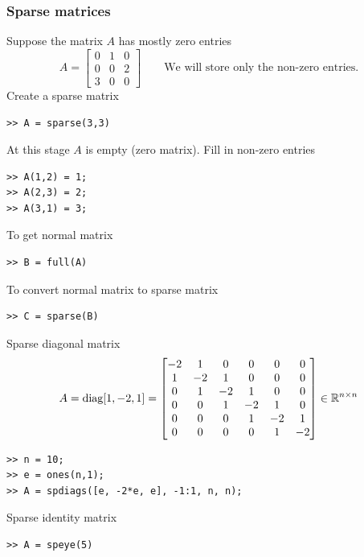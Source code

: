 \documentclass[11pt,xcolor=svgnames,onlymath]{beamer}
\begin{document}
\begin{frame}
\frametitle{Sparse matrices}
Suppose the matrix $A$ has mostly zero entries
\[
A = \begin{bmatrix}
0 & 1 & 0 \\
0 & 0 & 2 \\
3 & 0 & 0
\end{bmatrix} \qquad \mbox{We will store only the non-zero entries.}
\]
Create a sparse matrix
\begin{lstlisting}
>> A = sparse(3,3)
\end{lstlisting}

At this stage $A$ is empty (zero matrix). Fill in non-zero entries
\begin{lstlisting}
>> A(1,2) = 1;
>> A(2,3) = 2;
>> A(3,1) = 3;
\end{lstlisting}

To get normal matrix
\begin{lstlisting}
>> B = full(A)
\end{lstlisting}

To convert normal matrix to sparse matrix
\begin{lstlisting}
>> C = sparse(B)
\end{lstlisting}

Sparse diagonal matrix
\[
A = \mbox{diag}[1, -2, 1] = \begin{bmatrix}
-2 & 1 & 0 & 0 & 0 & 0 \\
1  & -2 & 1 & 0 & 0 & 0 \\
0  & 1 & -2 & 1 & 0 & 0 \\
0  & 0 & 1 & -2 & 1 & 0 \\
0  & 0 & 0 & 1 & -2 & 1 \\
0  & 0 & 0 & 0 & 1 & -2

\end{bmatrix} \in \mathbb{R}^{n \times n}
\]
\begin{lstlisting}
>> n = 10;
>> e = ones(n,1);
>> A = spdiags([e, -2*e, e], -1:1, n, n);
\end{lstlisting}

Sparse identity matrix
\begin{lstlisting}
>> A = speye(5)
\end{lstlisting}

\end{frame}
\end{document}

